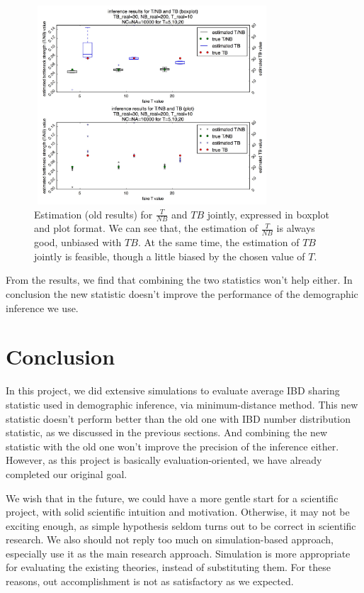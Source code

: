 \documentclass{bioinfo}
\begin{document}
\begin{figure}[h]
\centerline{\includegraphics[width=250pt, height=210pt]{TNBTB_old.jpg}}
\caption{Estimation (old results) for $\frac{T}{NB}$ and $TB$ jointly, expressed in boxplot and plot format. We can see that, the estimation of $\frac{T}{NB}$ is always good, unbiased with $TB$. At the same time, the estimation of $TB$ jointly is feasible, though a little biased by the chosen value of $T$.}\label{fig:TNBTB_old}
\end{figure}

From the results, we find that combining the two statistics won't help either. In conclusion the new statistic doesn't improve the performance of the demographic inference we use.





\section{Conclusion}

In this project, we did extensive simulations to evaluate average IBD sharing statistic used in demographic inference, via minimum-distance method. This new statistic doesn't perform better than the old one with IBD number distribution statistic, as we discussed in the previous sections. And combining the new statistic with the old one won't improve the precision of the inference either. However, as this project is basically evaluation-oriented, we have already completed our original goal.

We wish that in the future, we could have a more gentle start for a scientific project, with solid scientific intuition and motivation. Otherwise, it may not be exciting enough, as simple hypothesis seldom turns out to be correct in scientific research. We also should not reply too much on simulation-based approach, especially use it as the main research approach. Simulation is more appropriate for evaluating the existing theories, instead of substituting them. For these reasons, out accomplishment is not as satisfactory as we expected.
\end{document}
